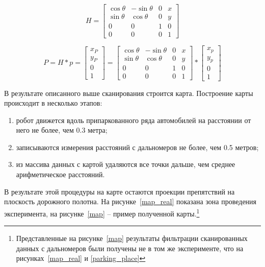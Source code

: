 \begin{equation}
	H = 
	\begin{bmatrix}
		\cos{\theta} & -\sin{\theta} & 0 & x \\
		\sin{\theta} & \cos{\theta} & 0 & y \\
		0 & 0 & 1 & 0\\
		0 & 0 & 0 & 1
	\end{bmatrix}
\end{equation}

\begin{equation}
	P = H * p = 
	\begin{bmatrix}
		x_P\\ y_P\\0\\1
	\end{bmatrix}
	= 
	\begin{bmatrix}
		\cos{\theta} & -\sin{\theta} & 0 & x \\
		\sin{\theta} & \cos{\theta} & 0 & y \\
		0 & 0 & 1 & 0\\
		0 & 0 & 0 & 1
	\end{bmatrix} 
	*
	\begin{bmatrix}
		x_p \\ y_p \\ 0\\ 1
	\end{bmatrix}
\end{equation}

В результате описанного выше сканирования строится карта. Построение карты происходит в несколько этапов:

\begin{enumerate}
	\item робот движется вдоль припаркованного ряда автомобилей на расстоянии от него не более, чем 0.3 метра;
	\item записываются измерения расстояний с дальномеров не более, чем 0.5 метров;
	\item из массива данных с картой удаляются все точки дальше, чем среднее арифметическое расстояний.
\end{enumerate}


В результате этой процедуры на карте остаются проекции препятствий на плоскость дорожного полотна. На рисунке~\ref{map_real} показана зона проведения эксперимента, на рисунке~\ref{map} -- пример полученной карты.\footnote{Представленные на рисунке~\ref{map} результаты фильтрации сканированных данных с дальномеров были получены не в том же эксперименте, что на рисунках~\ref{map_real} и \ref{parking_place}}

